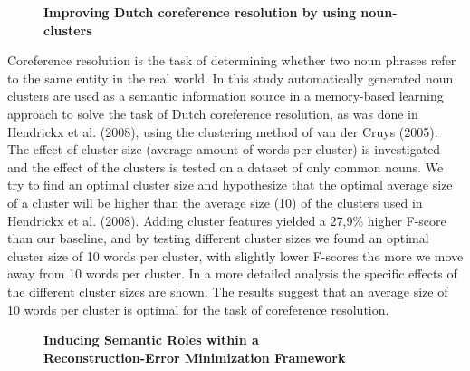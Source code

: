 \documentclass[10pt, a4paper, twopage, headinclude, footinclude, BCOR5mm]{book}
\begin{document}
\newpage

\begin{figure}[t!]
\centering
\large\textbf{Improving Dutch coreference resolution by using noun-clusters}
\vspace*{0.5cm}
\end{figure}


\begin{table}[t!]
\end{table} 
\noindent
Coreference resolution is the task of determining whether two noun phrases refer to the same entity in the real world. In this study automatically generated noun clusters are used as a semantic information source in a memory-based learning approach to solve the task of Dutch coreference resolution, as was done in Hendrickx et al. (2008), using the clustering method of van der Cruys (2005). The effect of cluster size (average amount of words per cluster) is investigated and the effect of the clusters is tested on a dataset of only common nouns. We try to find an optimal cluster size and hypothesize that the optimal average size of a cluster will be higher than the average size (10) of the clusters used in Hendrickx et al. (2008). Adding cluster features yielded a 27,9\% higher F-score than our baseline, and by testing different cluster sizes we found an optimal cluster size of 10 words per cluster, with slightly lower F-scores the more we move away from 10 words per cluster. In a more detailed analysis the specific effects of the different cluster sizes are shown. The results suggest that an average size of 10 words per cluster is optimal for the task of coreference resolution.   

\newpage

\begin{figure}[t!]
\centering
\large\textbf{Inducing Semantic Roles within a \\ Reconstruction-Error Minimization Framework}
\vspace*{0.5cm}
\end{figure}
\end{document}
